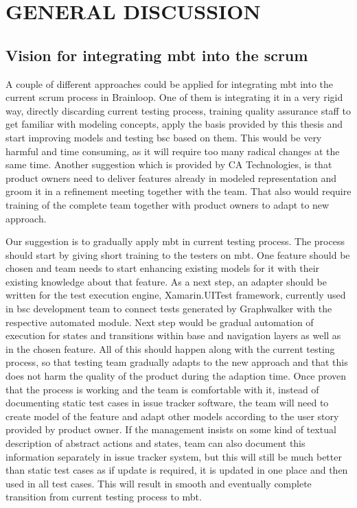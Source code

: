 \chapter{GENERAL DISCUSSION}
\label{chapter:conclusion}

\section{Vision for integrating \acrshort{mbt} into the scrum}

\par
A couple of different approaches could be applied for integrating \acrshort{mbt} into the current scrum process in Brainloop. One of them is integrating it in a very rigid way, directly discarding current testing process, training quality assurance staff to get familiar with modeling concepts, apply the basis provided by this thesis and start improving models and testing \acrshort{bsc} based on them. This would be very harmful and time consuming, as it will require too many radical changes at the same time. Another suggestion which is provided by CA Technologies, is that product owners need to deliver features already in modeled representation and groom it in a refinement meeting together with the team. That also would require training of the complete team together with product owners to adapt to new approach.

\par
Our suggestion is to gradually apply \acrshort{mbt} in current testing process. The process should start by giving short training to the testers on \acrshort{mbt}. One feature should be chosen and team needs to start enhancing existing models for it with their existing knowledge about that feature. As a next step, an adapter should be written for the test execution engine, Xamarin.UITest framework, currently used in \acrshort{bsc} development team to connect tests generated by Graphwalker with the respective automated module. Next step would be gradual automation of execution for states and transitions within base and navigation layers as well as in the chosen feature. All of this should happen along with the current testing process, so that testing team gradually adapts to the new approach and that this does not harm the quality of the product during the adaption time. Once proven that the process is working and the team is comfortable with it, instead of documenting static test cases in issue tracker software, the team will need to create model of the feature and adapt other models according to the user story provided by product owner. If the management insists on some kind of textual description of abstract actions and states, team can also document this information separately in issue tracker system, but this will still be much better than static test cases as if update is required, it is updated in one place and then used in all test cases. This will result in smooth and eventually complete transition from current testing process to \acrshort{mbt}.

